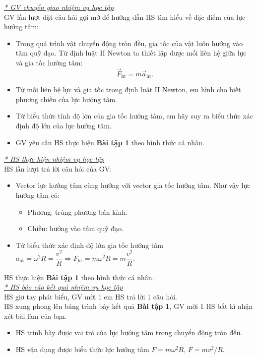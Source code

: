 {\textit{\underline{* GV chuyển giao nhiệm vụ học tập}}\\
	GV lần lượt đặt câu hỏi gợi mở để hướng dẫn HS tìm hiểu về đặc điểm của lực hướng tâm:
	\begin{itemize}[label=$-$]
		\item Trong quá trình vật chuyển động tròn đều, gia tốc của vật luôn hướng vào tâm quỹ đạo. Từ định luật II Newton ta thiết lập được mối liên hệ giữa lực và gia tốc hướng tâm:
		$$\vec{F}_{\mathrm{ht}}=m\vec{a}_{\mathrm{ht}}.$$
		\item Từ mối liên hệ lực và gia tốc trong định luật II Newton, em hình cho biết phương chiều của lực hướng tâm.
		\item Từ biểu thức tính độ lớn của gia tốc hướng tâm, em hãy suy ra biểu thức xác định độ lớn của lực hướng tâm.
		\item GV yêu cầu HS thực hiện \textbf{Bài tập 1} theo hình thức cá nhân.
	\end{itemize}
		\textit{\underline{* HS thực hiện nhiệm vụ học tập}}\\
	HS lần lượt trả lời câu hỏi của GV:
	\begin{itemize}
		\item Vector lực hướng tâm cùng hướng với vector gia tốc hướng tâm. Như vậy lực hướng tâm có:
		\begin{itemize}
			\item Phương: trùng phương bán kính.
			\item Chiều: hướng vào tâm quỹ đạo.
		\end{itemize}
		\item Từ biểu thức xác định độ lớn gia tốc hướng tâm $a_{\mathrm{ht}}=\omega^2R=\dfrac{v^2}{R}\Rightarrow F_{\mathrm{ht}}=m\omega^2 R=m\dfrac{v^2}{R}$.
	\end{itemize}
	HS thực hiện \textbf{Bài tập 1} theo hình thức cá nhân.\\
\textit{\underline{* HS báo cáo kết quả nhiệm vụ học tập}}\\
HS giơ tay phát biểu, GV mời 1 em HS trả lời 1 câu hỏi.\\
HS xung phong lên bảng trình bày kết quả \textbf{Bài tập 1}, GV mời 1 HS bất kì nhận xét bài làm của bạn.
}
{\begin{itemize}
		\item HS trình bày được vai trò của lực hướng tâm trong chuyển động tròn đều.
		\item HS vận dụng được biểu thức lực hướng tâm $F=m\omega^2 R$, $F=mv^2/R$.
	\end{itemize}

}
